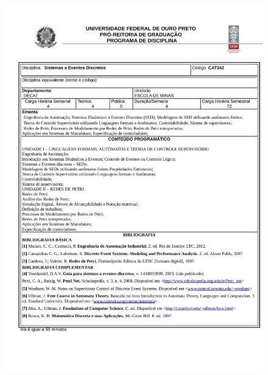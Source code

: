 \begin{figure}[p]
	\centering 
	\includegraphics[scale=0.7]{capitulos/anexo1-programas-disciplina/eg22.pdf}
\end{figure}

